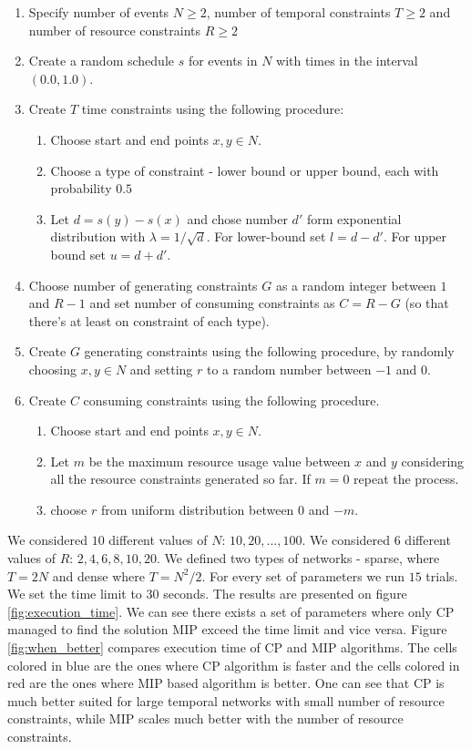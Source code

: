   \begin{enumerate}
  \setlength\itemsep{0.1em}
  \item Specify number of events $N \geq 2$, number of temporal constraints $T\geq 2$ and number of resource constraints $R\geq 2$
  \item Create a random schedule $s$ for events in $N$ with times in the interval $(0.0, 1.0)$.
  \item Create $T$ time constraints using the following procedure:
    \begin{enumerate}
    \item Choose start and end points $x,y \in N$.
    \item Choose a type of constraint - lower bound or upper bound, each with probability $0.5$
    \item Let $d=s(y) - s(x)$ and chose number $d'$ form exponential distribution with $\lambda = 1 / \sqrt{d}$. For lower-bound set $l = d - d'$. For upper bound set $u = d + d'$.
    \end{enumerate}
  \item Choose number of generating constraints $G$ as a random integer between $1$ and $R-1$ and set number of consuming constraints as $C = R - G$ (so that there's at least on constraint of each type).
  \item Create $G$ generating constraints using the following procedure, by randomly choosing $x,y \in N$ and setting $r$ to a random number between $-1$ and $0$.
  \item Create $C$ consuming constraints using the following procedure.
    \begin{enumerate}
    \item Choose start and end points $x,y \in N$.
    \item Let $m$ be the maximum resource usage value between $x$ and $y$ considering all the resource constraints generated so far. If $m = 0$ repeat the process.
    \item choose $r$ from uniform distribution between $0$ and $-m$.
    \end{enumerate}
  \end{enumerate}

We considered $10$ different values of $N$: $10, 20, ..., 100$. We considered $6$ different values of $R$: $2, 4, 6, 8, 10, 20$. We defined two types of networks - sparse, where $T = 2N$ and dense where $T = N^2/2$. For every set of parameters we run $15$ trials. We set the time limit to $30$ seconds. The results are presented on figure \ref{fig:execution_time}. We can see there exists a set of parameters where only CP managed to find the solution MIP exceed the time limit and vice versa. Figure \ref{fig:when_better} compares execution time of CP and MIP algorithms. The cells colored in blue are the ones where CP algorithm is faster and the cells colored in red are the ones where MIP based algorithm is better. One can see that CP is much better suited for large temporal networks with small number of resource constraints, while MIP scales much better with the number of resource constraints.

